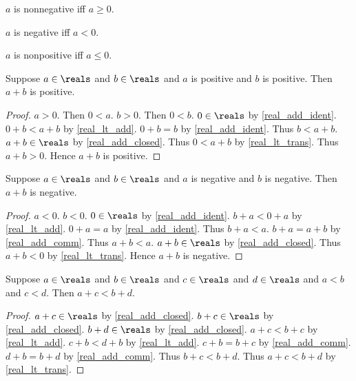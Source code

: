 \begin{abbreviation}\label{real_nonnegative}
    $a$ is nonnegative iff $a \geq 0$.
\end{abbreviation}

\begin{abbreviation}\label{real_negative}
    $a$ is negative iff $a < 0$.
\end{abbreviation}

\begin{abbreviation}\label{real_nonpositive}
    $a$ is nonpositive iff $a \leq 0$.
\end{abbreviation}

\begin{theorem}\label{real_pos_add}
    Suppose $a\in\reals$ and $b\in\reals$ and $a$ is positive and $b$ is positive.
    Then $a + b$ is positive.
\end{theorem}
\begin{proof}
    $a > 0$.
    Then $0 < a$.
    $b > 0$.
    Then $0 < b$.
    $0\in\reals$ by \cref{real_add_ident}.
    $0 + b < a + b$ by \cref{real_lt_add}.
    $0 + b = b$ by \cref{real_add_ident}.
    Thus $b < a + b$.
    $a + b\in\reals$ by \cref{real_add_closed}.
    Thus $0 < a + b$ by \cref{real_lt_trans}.
    Thus $a + b > 0$.
    Hence $a + b$ is positive.
\end{proof}

\begin{theorem}\label{real_neg_add}
    Suppose $a\in\reals$ and $b\in\reals$ and $a$ is negative and $b$ is negative.
    Then $a + b$ is negative.
\end{theorem}
\begin{proof}
    $a < 0$.
    $b < 0$.
    $0\in\reals$ by \cref{real_add_ident}.
    $b + a < 0 + a$ by \cref{real_lt_add}.
    $0 + a = a$ by \cref{real_add_ident}.
    Thus $b + a < a$.
    $b + a = a + b$ by \cref{real_add_comm}.
    Thus $a + b < a$.
    $a + b\in\reals$ by \cref{real_add_closed}.
    Thus $a + b < 0$ by \cref{real_lt_trans}.
    Hence $a + b$ is negative.
\end{proof}

\begin{theorem}\label{real_lt_add_two}
    Suppose $a\in\reals$ and $b\in\reals$ and $c\in\reals$ and $d\in\reals$ and $a < b$ and $c < d$.
    Then $a + c < b + d$.
\end{theorem}
\begin{proof}
    $a + c\in\reals$ by \cref{real_add_closed}.
    $b + c\in\reals$ by \cref{real_add_closed}.
    $b + d\in\reals$ by \cref{real_add_closed}.
    $a + c < b + c$ by \cref{real_lt_add}.
    $c + b < d + b$ by \cref{real_lt_add}.
    $c + b = b + c$ by \cref{real_add_comm}.
    $d + b = b + d$ by \cref{real_add_comm}.
    Thus $b + c < b + d$.
    Thus $a + c < b + d$ by \cref{real_lt_trans}.
\end{proof}

